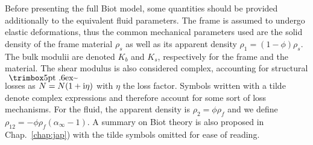 Before presenting the full Biot model, some quantities should be provided additionally to the equivalent fluid parameters. The frame is assumed to undergo elastic deformations, thus the common mechanical parameters used are the solid density of the frame material $\rho_s$ as well as its apparent density $\rho_1 = (1-\phi)\rho_s$. The bulk modulii are denoted $K_b$ and $K_s$, respectively for the frame and the material.  The shear modulus is also considered complex, accounting for structural losses as $\tilde{N} = N(1+\im \eta)$ with $\eta$ the loss factor. Symbols written with a tilde denote complex expressions and therefore account for some sort of loss mechanisms. For the fluid, the apparent density is $\rho_2 = \phi \rho_f$ and we define $\rho_{12} = - \phi \rho_f(\alpha_\infty - 1)$. A summary on Biot theory is also proposed in Chap.~\ref{chap:jap}) with the tilde symbols omitted for ease of reading.

